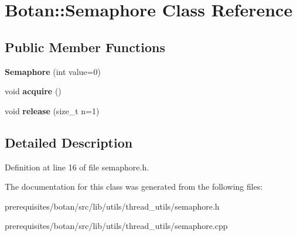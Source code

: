\hypertarget{class_botan_1_1_semaphore}{}\section{Botan\+:\+:Semaphore Class Reference}
\label{class_botan_1_1_semaphore}
\subsection*{Public Member Functions}
\begin{DoxyCompactItemize}
\item 
\mbox{\label{class_botan_1_1_semaphore_acbfb18e7f803fd8150c0dfc649a30513}} 
{\bfseries Semaphore} (int value=0)
\item 
\mbox{\label{class_botan_1_1_semaphore_ad46108e049eb3c70875e3fe60c0a2325}} 
void {\bfseries acquire} ()
\item 
\mbox{\label{class_botan_1_1_semaphore_a8d7be3578f5474eb8d00ba50d0a5b22c}} 
void {\bfseries release} (size\+\_\+t n=1)
\end{DoxyCompactItemize}


\subsection{Detailed Description}


Definition at line 16 of file semaphore.\+h.



The documentation for this class was generated from the following files\+:\begin{DoxyCompactItemize}
\item 
prerequisites/botan/src/lib/utils/thread\+\_\+utils/semaphore.\+h\item 
prerequisites/botan/src/lib/utils/thread\+\_\+utils/semaphore.\+cpp\end{DoxyCompactItemize}
